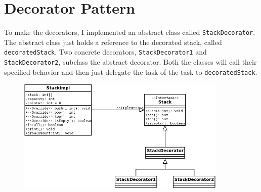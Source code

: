 \documentclass[english,12pt]{article}
\begin{document}
\section*{Decorator Pattern}
To make the decorators, I implemented an abstract class called \texttt{StackDecorator}.
The abstract class just holds a reference to the decorated stack, called \texttt{decoratedStack}.
Two concrete decorators, \texttt{StackDecorator1} and \texttt{StackDecorator2},
subclass the abstract decorator. Both the classes will call their specified behavior
and then just delegate the task of the task to \texttt{decoratedStack}.
\begin{figure}[H]
   \includegraphics[width=10cm]{diagrams/StackDecorator.png}
\end{figure}
\end{document}
